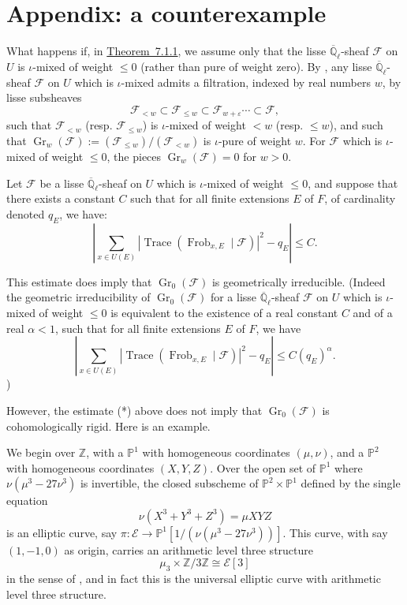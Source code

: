 \section{Appendix: a counterexample}
\label{sec:7.2}

What happens if, in \hyperref[thm:7.1.1]{Theorem~7.1.1}, we assume only that the lisse \(\overline{\mathbb{Q}}_\ell\)-sheaf \(\mathcal{F}\) on \(U\) is \(\iota\)-mixed of weight \(\leq0\) (rather than pure of weight zero). By \cite[3.4.9]{De-WeilII}, any lisse \(\overline{\mathbb{Q}}_\ell\)-sheaf \(\mathcal{F}\) on \(U\) which is \(\iota\)-mixed admits a filtration, indexed by real numbers \(w\), by lisse subsheaves
\[
\mathcal{F}_{<w}\subset\mathcal{F}_{\leq w}\subset\mathcal{F}_{w+\varepsilon}\cdots\subset\mathcal{F},
\]
such that \(\mathcal{F}_{<w}\) (resp. \(\mathcal{F}_{\leq w}\)) is \(\iota\)-mixed of weight \(<w\) (resp. \(\leq w\)), and such that \(\operatorname{Gr}_w(\mathcal{F}):=(\mathcal{F}_{\leq w})/(\mathcal{F}_{<w})\) is \(\iota\)-pure of weight \(w\). For \(\mathcal{F}\) which is \(\iota\)-mixed of weight \(\leq0\), the pieces \(\operatorname{Gr}_w(\mathcal{F})=0\) for \(w>0\).

Let \(\mathcal{F}\) be a lisse \(\overline{\mathbb{Q}}_\ell\)-sheaf on \(U\) which is \(\iota\)-mixed of weight \(\leq0\), and suppose that there exists a constant \(C\) such that for all finite extensions \(E\) of \(F\), of cardinality denoted \(q_E\), we have:
\[
\tag{*}
\left|\sum_{x\in U(E)}|\operatorname{Trace}(\operatorname{Frob}_{x,E}\mid\mathcal{F})|^2-q_E\right|\leq C.
\]

This estimate does imply that \(\operatorname{Gr}_0(\mathcal{F})\) is geometrically irreducible. (Indeed the geometric irreducibility of \(\operatorname{Gr}_0(\mathcal{F})\) for a lisse \(\overline{\mathbb{Q}}_\ell\)-sheaf \(\mathcal{F}\) on \(U\) which is \(\iota\)-mixed of weight \(\leq0\) is equivalent to the existence of a real constant \(C\) and of a real \(\alpha<1\), such that for all finite extensions \(E\) of \(F\), we have
\[
\left|\sum_{x\in U(E)}|\operatorname{Trace}(\operatorname{Frob}_{x,E}\mid\mathcal{F})|^2-q_E\right|\leq C(q_E)^\alpha.
\]
)

However, the estimate (*) above does not imply that \(\operatorname{Gr}_0(\mathcal{F})\) is cohomologically rigid. Here is an example.

We begin over \(\mathbb{Z}\), with a \(\mathbb{P}^1\) with homogeneous coordinates \((\mu,\nu)\), and a \(\mathbb{P}^2\) with homogeneous coordinates \((X,Y,Z)\). Over the open set of \(\mathbb{P}^1\) where \(\nu(\mu^3-27\nu^3)\) is invertible, the closed subscheme of \(\mathbb{P}^2\times\mathbb{P}^1\) defined by the single equation
\[
\nu(X^3+Y^3+Z^3)=\mu XYZ
\]
is an elliptic curve, say \(\pi:\mathcal{E}\to\mathbb{P}^1[1/(\nu(\mu^3-27\nu^3))]\). This curve, with say \((1,-1,0)\) as origin, carries an arithmetic level three structure
\[
\mu_3\times\mathbb{Z}/3\mathbb{Z}\cong\mathcal{E}[3]
\]
in the sense of \cite[2.0.4]{Ka-RA}, and in fact this is the universal elliptic curve with arithmetic level three structure.

